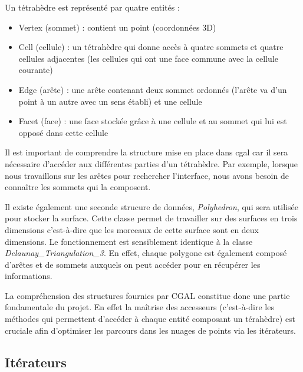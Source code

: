 Un tétrahèdre est représenté par quatre entités :
\begin{itemize}
  \item Vertex (sommet) : contient un point (coordonnées 3D)
  \item Cell (cellule) : un tétrahèdre qui donne accès à quatre sommets et quatre cellules adjacentes (les
  cellules qui ont une face commune avec la cellule courante)
  \item Edge (arête) : une arête contenant deux sommet ordonnés (l'arête va d'un point
  à un autre avec un sens établi) et une cellule
  \item Facet (face) : une face stockée grâce à une cellule et au sommet qui lui
  est opposé dans cette cellule
\end{itemize}

Il est important de comprendre la structure mise en place dans \gls{cgal} car il sera
nécessaire d'accéder aux différentes parties d'un tétrahèdre. Par exemple, lorsque
nous travaillons sur les arêtes pour rechercher l'interface, nous avons besoin de
connaître les sommets qui la composent.

Il existe également une seconde strucure de données, \textit{Polyhedron}, qui sera
utilisée pour stocker la surface. Cette classe permet de travailler sur des surfaces
en trois dimensions c'est-à-dire que les morceaux de cette surface sont en deux dimensions.
Le fonctionnement est sensiblement identique à la classe \textit{Delaunay\_Triangulation\_3}.
En effet, chaque polygone est également composé d'arêtes et de sommets auxquels on peut
accéder pour en récupérer les informations.

La compréhension des structures fournies par CGAL constitue donc une partie fondamentale du
projet. En effet la maîtrise des accesseurs (c'est-à-dire les méthodes qui permettent
d'accéder à chaque entité composant un térahèdre) est cruciale afin d'optimiser les parcours
dans les nuages de points via les itérateurs.





\subsection*{Itérateurs}

